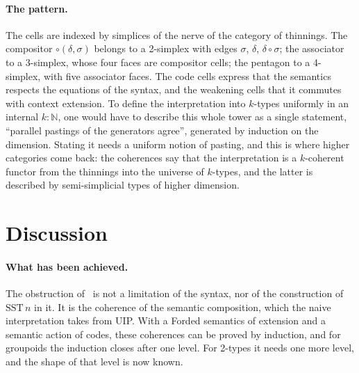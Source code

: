 \documentclass[11pt]{article}
\newcommand{\ag}[1]{\texttt{\detokenize{#1}}}
\begin{document}
\paragraph{The pattern.}
The cells are indexed by simplices of the nerve of the category of
thinnings. The compositor $\circ(\delta,\sigma)$ belongs to a 2-simplex with
edges $\sigma$, $\delta$, $\delta\circ\sigma$; the associator \ag{cohAs} to a
3-simplex, whose four faces are compositor cells; the pentagon to a
4-simplex, with five associator faces. The code cells express that the
semantics respects the equations of the syntax, and the weakening cells that
it commutes with context extension. To define the interpretation into
$k$-types uniformly in an internal $k:\mathbb N$, one would have to describe
this whole tower as a single statement, ``parallel pastings of the
generators agree'', generated by induction on the dimension. Stating it needs
a uniform notion of pasting, and this is where higher categories come back:
the coherences say that the interpretation is a $k$-coherent functor from the
thinnings into the universe of $k$-types, and the latter is described by
semi-simplicial types of higher dimension.

\section{Discussion}\label{sec:discussion}

\paragraph{What has been achieved.}
The obstruction of~\cite{obstruction} is not a limitation of the
syntax, nor of the construction of $\mathrm{SST}\,n$ in it. It is the
coherence of the semantic composition, which the naive interpretation takes
from UIP. With a Forded semantics of extension and a semantic action of
codes, these coherences can be proved by induction, and for groupoids the
induction closes after one level. For 2-types it needs one more level, and the
shape of that level is now known.
\end{document}
